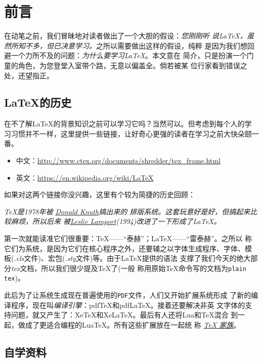 \section{前言}

在动笔之前，我们冒昧地对读者做出了一个大胆的假设：\emph{您刚刚听
  说\LaTeX{}，虽然所知不多，但已决意学习。}之所以需要做出这样的假设，纯粹
是因为我们想回避一个力所不及的问题：\emph{为什么要学习\LaTeX{}}。本文意在
简介，只是扮演一个门童的角色，为您登堂入室带个路，无意以偏盖全。倘若被某
位行家看到错误之处，还望指正。

\subsection{\LaTeX{}的历史}

在不了解\LaTeX{}的背景知识之前可以学习它吗？当然可以。但考虑到每个人的学
习习惯并不一样，这里提供一些链接，让好奇心更强的读者在学习之前大快朵颐一
番。

\begin{itemize}
\item 中文：\url{http://www.ctex.org/documents/shredder/tex_frame.html}
\item 英文：\url{https://en.wikipedia.org/wiki/LaTeX}
\end{itemize}

如果对这两个链接你没兴趣，这里有个较为简捷的历史回顾：

\emph{
  \TeX{}是1978年被
  \href{https://en.wikipedia.org/wiki/Donald_Knuth}{Donald Knuth}搞出来的
  排版系统。这套玩意好是好，但搞起来比较麻烦，所以后来
  被\href{https://en.wikipedia.org/wiki/Leslie_Lamport}{Leslie
    Lamport}(1994)改进了一下形成了\LaTeX{}。}

第一次就能读准它们很重要：\TeX{}——“泰赫”；\LaTeX{}——“雷泰赫”。之所以
称它们为系统，是因为它们在核心程序之外，还要辅之以字体生成程序、字体、模
板(\textit{.cls}文件)、宏包(\textit{.sty}文件)等。由于\LaTeX{}提供的语法
支撑了我们今天的绝大部分\textit{tex}文档，所以我们很少提及\TeX{}了(一般
称用原始\TeX{}命令写的文档为\texttt{plain tex})。

此后为了让系统生成现在普遍使用的\texttt{PDF}文件，人们又开始扩展系统形成
了新的编译程序，现在叫\emph{编译引擎}：pdfTeX和pdfLaTeX。接着还要解决非英
文字体的支持问题，就又产生了：XeTeX和XeLaTeX。最后有人还将Lua和\TeX{}混合
到一起，做成了更适合编程的LuaTeX。所有这些扩展放在一起统
称
\href{https://www.sharelatex.com/blog/2012/12/01/the-tex-family-tree-latex-pdftex-xelatex-luatex-context.html}{\emph{\TeX{}
    家族}}。

\subsection{自学资料}

